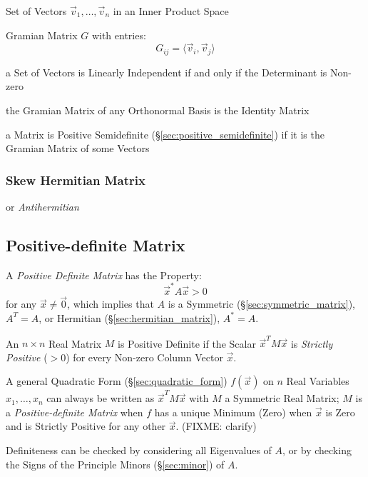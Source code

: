Set of Vectors $\vec{v}_1,\ldots,\vec{v}_n$ in an Inner Product Space

Gramian Matrix $G$ with entries:
\[
  G_{ij} = \langle{\vec{v}_i,\vec{v}_j}\rangle
\]

a Set of Vectors is Linearly Independent if and only if the Determinant is
Non-zero

the Gramian Matrix of any Orthonormal Basis is the Identity Matrix

a Matrix is Positive Semidefinite (\S\ref{sec:positive_semidefinite}) if it is
the Gramian Matrix of some Vectors



\subsubsection{Skew Hermitian Matrix}\label{sec:skew_hermitian}

or \emph{Antihermitian}



\subsection{Positive-definite Matrix}\label{sec:positive_definite}

A \emph{Positive Definite Matrix} has the Property:
\[
  \vec{x}^* A \vec{x} > 0
\]
for any $\vec{x} \neq \vec{0}$, which implies that $A$ is a Symmetric
(\S\ref{sec:symmetric_matrix}), $A^T = A$, or Hermitian
(\S\ref{sec:hermitian_matrix}), $A^* = A$.

An $n \times n$ Real Matrix $M$ is Positive Definite if the Scalar
$\vec{x}^TM\vec{x}$ is \emph{Strictly Positive} ($>0$) for every Non-zero
Column Vector $\vec{x}$.

A general Quadratic Form (\S\ref{sec:quadratic_form}) $f(\vec{x})$ on $n$ Real
Variables $x_1,\ldots,x_n$ can always be written as $\vec{x}^T M \vec{x}$ with
$M$ a Symmetric Real Matrix; $M$ is a \emph{Positive-definite Matrix} when $f$
has a unique Minimum (Zero) when $\vec{x}$ is Zero and is Strictly Positive for
any other $\vec{x}$. (FIXME: clarify)

Definiteness can be checked by considering all Eigenvalues of $A$, or by
checking the Signs of the Principle Minors (\S\ref{sec:minor}) of $A$.

